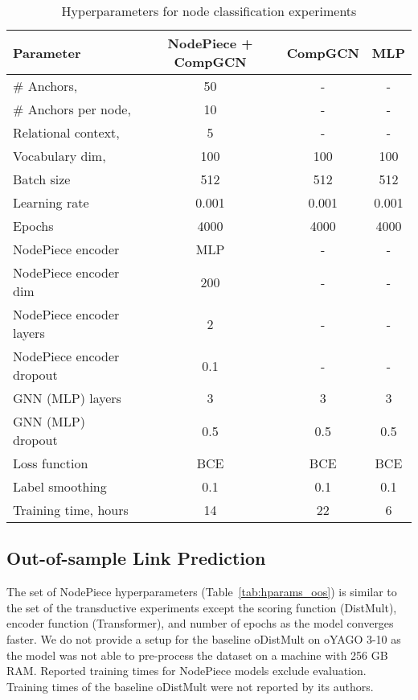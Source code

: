 \documentclass{article} \usepackage{iclr2022_conference,times}
\begin{document}
\begin{table}[!h]
\centering
\caption{Hyperparameters for node classification experiments}
\label{tab:hyperparams_nc}
\begin{tabular}{@{}lccc@{}}
\toprule
Parameter & NodePiece + CompGCN & CompGCN & MLP \\ \midrule
\# Anchors,  & 50 & - & - \\
\# Anchors per node,  & 10 & - & -  \\
Relational context,  & 5 & - & -  \\
Vocabulary dim,  & 100 & 100 & 100  \\
Batch size & 512 & 512 & 512  \\
Learning rate & 0.001 & 0.001 & 0.001  \\
Epochs & 4000 & 4000 & 4000  \\
NodePiece encoder & MLP & - & -  \\
NodePiece encoder dim & 200 & - & -   \\
NodePiece encoder layers & 2 & - & -  \\
NodePiece encoder dropout & 0.1 & - & -  \\
GNN (MLP) layers & 3 & 3 & 3 \\
GNN (MLP) dropout & 0.5 & 0.5 & 0.5 \\
Loss function & BCE & BCE & BCE  \\
Label smoothing & 0.1 & 0.1 & 0.1  \\ \midrule
Training time, hours & 14 & 22 & 6  \\
\bottomrule
\end{tabular}
\end{table}

\subsection{Out-of-sample Link Prediction}

The set of NodePiece hyperparameters (Table~\ref{tab:hparams_oos}) is similar to the set of the transductive experiments except the scoring function (DistMult), encoder function (Transformer), and number of epochs as the model converges faster. 
We do not provide a setup for the baseline oDistMult on oYAGO 3-10 as the model was not able to pre-process the dataset on a machine with 256 GB RAM.
Reported training times for NodePiece models exclude evaluation. 
Training times of the baseline oDistMult were not reported by its authors.
\end{document}
